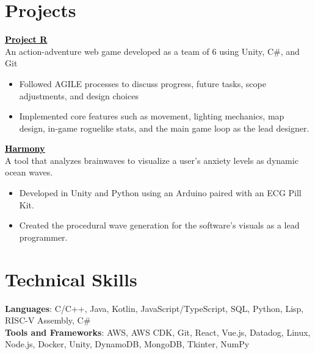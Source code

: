\documentclass[12pt, letterpaper]{article}
\newenvironment{highlights}{
    \begin{itemize}[
        topsep=0.10 cm,
        parsep=0.10 cm,
        partopsep=0pt,
        itemsep=0pt,
        leftmargin=0.4 cm + 10pt
    ]
}{
    \end{itemize}
} %
\let\hrefWithoutArrow\href
\renewcommand{\href}[2]{\hrefWithoutArrow{#1}{\ifthenelse{\equal{#2}{}}{ }{#2 }\raisebox{.15ex}{\footnotesize \faExternalLink*}}}
\begin{document}
\section{Projects}
\hrefWithoutArrow{https://aibrain.itch.io/project-r}{\textcolor{black}{\textbf{\underline{Project R}}}} %
\\ An action-adventure web game developed as a team of 6 using Unity, C\#, and Git %
\begin{highlights}
    
    \item Followed AGILE processes to discuss progress, future tasks, scope adjustments, and design choices
    \item Implemented core features such as movement, lighting mechanics, map design, in-game roguelike stats, and the main game loop as the lead designer. 
\end{highlights}
\hrefWithoutArrow{https://devpost.com/software/harmony-gl98p1}{\textcolor{black}{\textbf{\underline{Harmony}}}} %
\\  A tool that analyzes brainwaves to visualize a user's anxiety levels as dynamic ocean waves.  %
\begin{highlights}
   
    \item Developed in Unity and Python using an Arduino paired with an ECG Pill Kit. 
    \item Created the procedural wave generation for the software’s visuals as a lead programmer.
\end{highlights}

\section{Technical Skills}

     \textbf{Languages}{: C/C++, Java, Kotlin, JavaScript/TypeScript, SQL, Python, Lisp, RISC-V Assembly, C\#}\\
     \textbf{Tools and Frameworks}{: AWS, AWS CDK, Git, React, Vue.js, Datadog, Linux, Node.js, Docker, Unity, DynamoDB, MongoDB, Tkinter, NumPy} 
\end{document}
